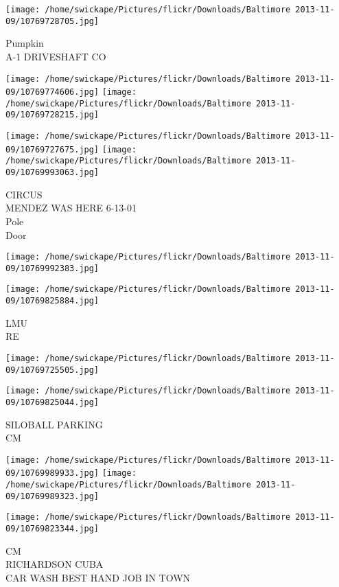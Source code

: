 \documentclass[10pt,letterpaper]{article}
\begin{document}
\vspace{0.25in}
\texttt{[image: /home/swickape/Pictures/flickr/Downloads/Baltimore 2013-11-09/10769728705.jpg]}

Pumpkin\\
A{-}1 DRIVESHAFT CO
\pagebreak

\texttt{[image: /home/swickape/Pictures/flickr/Downloads/Baltimore 2013-11-09/10769774606.jpg]}
\texttt{[image: /home/swickape/Pictures/flickr/Downloads/Baltimore 2013-11-09/10769728215.jpg]}

\texttt{[image: /home/swickape/Pictures/flickr/Downloads/Baltimore 2013-11-09/10769727675.jpg]}
\texttt{[image: /home/swickape/Pictures/flickr/Downloads/Baltimore 2013-11-09/10769993063.jpg]}

CIRCUS\\
MENDEZ WAS HERE 6{-}13{-}01\\
Pole\\
Door
\pagebreak

\texttt{[image: /home/swickape/Pictures/flickr/Downloads/Baltimore 2013-11-09/10769992383.jpg]}

\vspace{0.25in}
\texttt{[image: /home/swickape/Pictures/flickr/Downloads/Baltimore 2013-11-09/10769825884.jpg]}

LMU\\
RE
\pagebreak

\texttt{[image: /home/swickape/Pictures/flickr/Downloads/Baltimore 2013-11-09/10769725505.jpg]}

\vspace{0.25in}
\texttt{[image: /home/swickape/Pictures/flickr/Downloads/Baltimore 2013-11-09/10769825044.jpg]}

SILOBALL PARKING\\
CM
\pagebreak

\texttt{[image: /home/swickape/Pictures/flickr/Downloads/Baltimore 2013-11-09/10769989933.jpg]}
\texttt{[image: /home/swickape/Pictures/flickr/Downloads/Baltimore 2013-11-09/10769989323.jpg]}

\texttt{[image: /home/swickape/Pictures/flickr/Downloads/Baltimore 2013-11-09/10769823344.jpg]}

CM\\
RICHARDSON CUBA\\
CAR WASH BEST HAND JOB IN TOWN
\pagebreak
\end{document}
